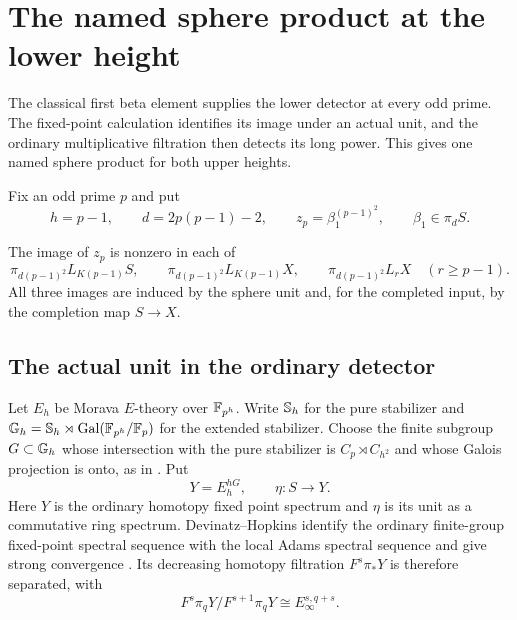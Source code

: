 \section{The named sphere product at the lower height}
\label{sec:lower-sphere-product}

The classical first beta element supplies the lower detector at every
odd prime. The fixed-point calculation identifies its image under an
actual unit, and the ordinary multiplicative filtration then detects
its long power. This gives one named sphere product for both upper
heights.

Fix an odd prime $p$ and put
\[
 h=p-1,\qquad d=2p(p-1)-2,\qquad
 z_p=\beta_1^{(p-1)^2},\qquad \beta_1\in\pi_dS.
\]

\begin{theorem}\label{thm:lower-sphere-product}
The image of $z_p$ is nonzero in each of
\[
 \pi_{d(p-1)^2}L_{K(p-1)}S,\qquad
 \pi_{d(p-1)^2}L_{K(p-1)}X,\qquad
 \pi_{d(p-1)^2}L_rX\quad(r\geq p-1).
\]
All three images are induced by the sphere unit and, for the completed
input, by the completion map $S\to X$.
\end{theorem}

\subsection{The actual unit in the ordinary detector}

Let $E_h$ be Morava $E$-theory over $\mathbb F_{p^h}$. Write $\mathbb S_h$ for
the pure stabilizer and
$\mathbb G_h=\mathbb S_h\rtimes\operatorname{Gal}(\mathbb F_{p^h}/\mathbb F_p)$ for the extended stabilizer.
Choose the finite subgroup $G\subset\mathbb G_h$ whose intersection with the pure
stabilizer is $C_p\rtimes C_{h^2}$ and whose Galois projection is onto,
as in \cite[Section~2]{heard2015}. Put
\[
 Y=E_h^{hG},\qquad \eta:S\longrightarrow Y.
\]
Here $Y$ is the ordinary homotopy fixed point spectrum and $\eta$ is
its unit as a commutative ring spectrum. Devinatz--Hopkins identify the
ordinary finite-group fixed-point spectral sequence with the local
Adams spectral sequence and give strong convergence
\cite[Theorems~2(ii) and~3]{dh2004}. Its decreasing homotopy filtration
$F^s\pi_*Y$ is therefore separated, with
\[
 F^s\pi_qY/F^{s+1}\pi_qY\cong E_\infty^{s,q+s}.
\]

